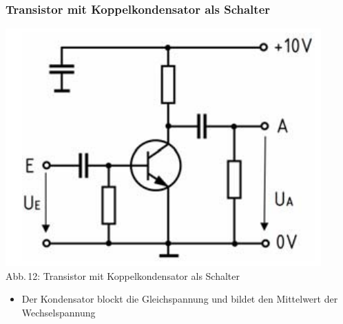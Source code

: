 \begin{frame}
	\frametitle{Transistor mit Koppelkondensator als Schalter}
	\begin{minipage}{0.4\textwidth}
	\begin{center}
			\includegraphics[width=\textwidth,height=.85\textheight,keepaspectratio]{a06/Transistor-Schalter+C.png}\\
			{\tiny Abb.\,12: Transistor mit Koppelkondensator als Schalter~\cite{bnetza}}
		\end{center}
	      \end{minipage}
	      \hspace{3mm}
	      \begin{minipage}{0.5\textwidth}
		\begin{itemize}
			\item	Der Kondensator blockt die Gleichspannung und bildet den Mittelwert der Wechselspannung
		\end{itemize}
	      \end{minipage}
\end{frame}

